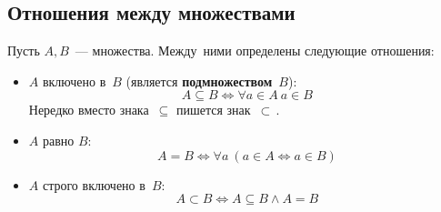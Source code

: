 \subsection{Отношения между множествами}
Пусть $A, B$~--- множества. Между~ними определены следующие отношения:
\begin{itemize}
	\item $A$ включено в~$B$ (является \textbf{подмножеством}~$B$):
	\[ A \subseteq B \Leftrightarrow \forall a \in A \ a \in B \]
	Нередко вместо знака~$\subseteq$ пишется знак~$\subset$\,.
	\item $A$ равно $B$:
	\[ A = B \Leftrightarrow \forall a \ (a \in A \Leftrightarrow a \in B) \]
	\item $A$ строго включено в~$B$:
	\[ A \subset B \Leftrightarrow A \subseteq B \land A = B \]
\end{itemize}